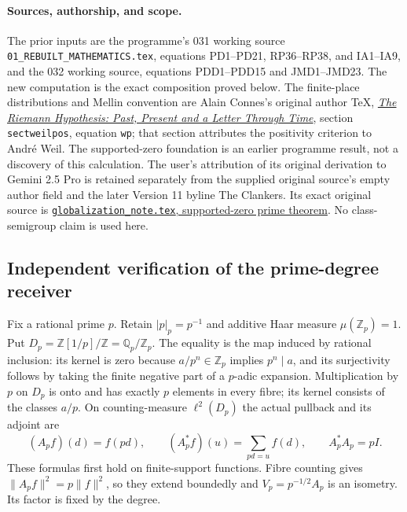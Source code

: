 \documentclass[11pt]{article}
\begin{document}
\paragraph{Sources, authorship, and scope.}
The prior inputs are the programme's 031 working source
\texttt{01\_REBUILT\_MATHEMATICS.tex}, equations PD1--PD21,
RP36--RP38, and IA1--IA9, and the 032 working source, equations
PDD1--PDD15 and JMD1--JMD23. The new computation is the exact
composition proved below. The finite-place distributions and
Mellin convention are Alain Connes's original author TeX,
\href{https://arxiv.org/abs/2602.04022v1}{\emph{The Riemann
Hypothesis: Past, Present and a Letter Through Time}},
section \texttt{sectweilpos}, equation \texttt{wp}; that section
attributes the positivity criterion to Andr\'e Weil.
The supported-zero foundation is an earlier programme result, not a
discovery of this calculation. The user's attribution of its original
derivation to Gemini 2.5 Pro is retained separately from the supplied
original source's empty author field and the later Version 11 byline
The Clankers. Its exact original source is
\href{https://github.com/KokunoYumeto/zeta-function-research-reader/blob/d2f0020a7c446f429682925c1c682d99ba86a4cc/workbenches/splitzero-tandem/foundations/globalization-semiring/globalization_note.tex#L298}{\texttt{globalization\_note.tex}, supported-zero prime theorem}.
No class-semigroup claim is used here.

\subsection{Independent verification of the prime-degree receiver}

Fix a rational prime $p$. Retain $|p|_p=p^{-1}$ and additive Haar
measure $\mu(\mathbb Z_p)=1$. Put
$D_p=\mathbb Z[1/p]/\mathbb Z=\mathbb Q_p/\mathbb Z_p$.
The equality is the map induced by rational inclusion: its kernel is
zero because $a/p^n\in\mathbb Z_p$ implies $p^n\mid a$, and its
surjectivity follows by taking the finite negative part of a $p$-adic
expansion. Multiplication by $p$ on $D_p$ is onto and has exactly
$p$ elements in every fibre; its kernel consists of the classes $a/p$.
On counting-measure $\ell^2(D_p)$ the actual pullback and its adjoint are
\[
 (A_pf)(d)=f(pd),\qquad
 (A_p^*f)(u)=\sum_{pd=u}f(d),\qquad A_p^*A_p=pI.
 \tag{PME1}
\]
These formulas first hold on finite-support functions. Fibre counting
gives $\|A_pf\|^2=p\|f\|^2$, so they extend boundedly and
$V_p=p^{-1/2}A_p$ is an isometry. Its factor is fixed by the degree.
\end{document}
